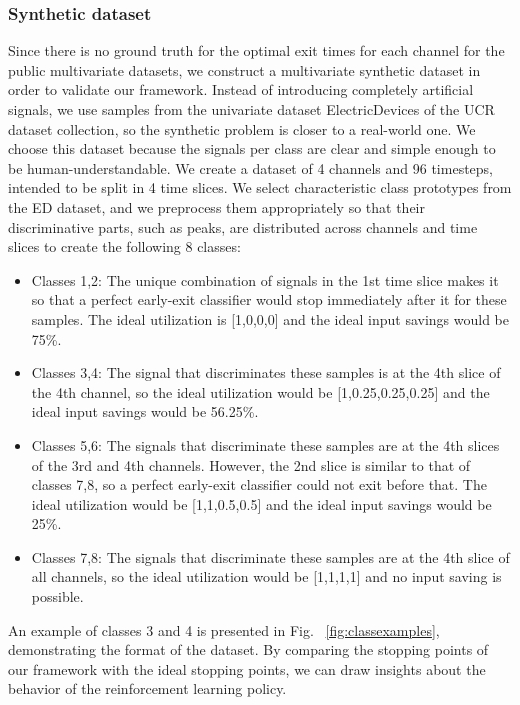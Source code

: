 \documentclass[conference]{IEEEtran}
\begin{document}
\subsubsection{Synthetic dataset}
Since there is no ground truth for the optimal exit times for each channel for the public multivariate datasets, we construct a multivariate synthetic dataset in order to validate our framework. Instead of introducing completely artificial signals, we use samples from the univariate dataset ElectricDevices of the UCR dataset collection\cite{dau2019ucr}, so the synthetic problem is closer to a real-world one. We choose this dataset because the signals per class are clear and simple enough to be human-understandable. We create a dataset of 4 channels and 96 timesteps, intended to be split in 4 time slices. We select characteristic class prototypes from the ED dataset, and we preprocess them appropriately so that their discriminative parts, such as peaks, are distributed across channels and time slices to create the following 8 classes:
\begin{itemize}
\item Classes 1,2: The unique combination of signals in the 1st time slice makes it so that a perfect early-exit classifier would stop immediately after it for these samples. The ideal utilization is [1,0,0,0] and the ideal input savings would be 75\%.
\item Classes 3,4: The signal that discriminates these samples is at the 4th slice of the 4th channel, so the ideal utilization would be [1,0.25,0.25,0.25] and the ideal input savings would be 56.25\%.
\item Classes 5,6: The signals that discriminate these samples are at the 4th slices of the 3rd and 4th channels. However, the 2nd slice is similar to that of classes 7,8, so a perfect early-exit classifier could not exit before that. The ideal utilization would be [1,1,0.5,0.5] and the ideal input savings would be 25\%.
\item Classes 7,8: The signals that discriminate these samples are at the 4th slice of all channels, so the ideal utilization would be [1,1,1,1] and no input saving is possible.
\end{itemize}

An example of classes 3 and 4 is presented in Fig. ~\ref{fig:classexamples}, demonstrating the format of the dataset. By comparing the stopping points of our framework with the ideal stopping points, we can draw insights about the behavior of the reinforcement learning policy.
\end{document}
